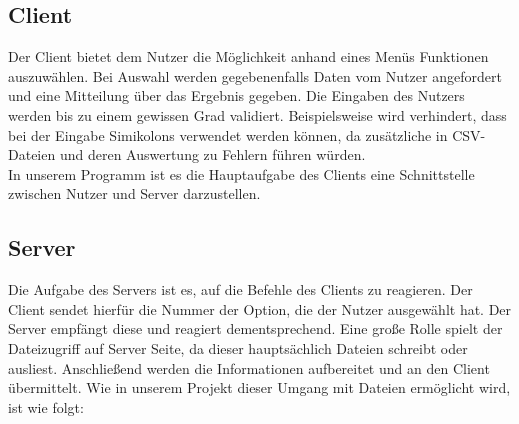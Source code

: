 \documentclass{scrartcl}
\begin{document}
	\subsection{Client}
		Der Client bietet dem Nutzer die Möglichkeit anhand eines Menüs Funktionen auszuwählen. Bei Auswahl werden gegebenenfalls Daten vom Nutzer angefordert und eine Mitteilung über das Ergebnis gegeben. Die Eingaben des Nutzers werden bis zu einem gewissen Grad validiert. Beispielsweise wird verhindert, dass bei der Eingabe Simikolons verwendet werden können, da zusätzliche in CSV-Dateien und deren Auswertung zu Fehlern führen würden.\\
		In unserem Programm ist es die Hauptaufgabe des Clients eine Schnittstelle zwischen Nutzer und Server darzustellen.
	\subsection{Server}
		Die Aufgabe des Servers ist es, auf die Befehle des Clients zu reagieren. Der Client sendet hierfür die Nummer der Option, die der Nutzer ausgewählt hat. Der Server empfängt diese und reagiert dementsprechend. Eine große Rolle spielt der Dateizugriff auf Server Seite, da dieser hauptsächlich Dateien schreibt oder ausliest. Anschließend werden die Informationen aufbereitet und an den Client übermittelt. Wie in unserem Projekt dieser Umgang mit Dateien ermöglicht wird, ist wie folgt:
\end{document}
